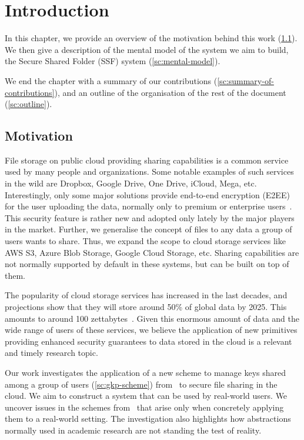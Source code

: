 \chapter{Introduction}
In this chapter, we provide an overview of the motivation
behind this work (\cref{intro-motivation}). 
We then give a
description of the mental model of the system we aim to build,
the Secure Shared Folder (SSF) system (\cref{sc:mental-model}).

We end the chapter with a summary of our contributions (\cref{sc:summary-of-contributions}),
and an outline of the organisation of the rest of the document (\cref{sc:outline}).

\section{Motivation}\label{intro-motivation}

File storage on public cloud providing sharing capabilities is a common service used by many people and organizations.
Some notable examples of such services in the wild are Dropbox, Google Drive, One Drive, iCloud, Mega, etc.
Interestingly, only some major solutions provide end-to-end encryption (E2EE) for the user uploading 
the data, normally only to premium or enterprise users~\cite{Dropbox,googleWorkspaceE2EE,Apple,Mega}.
This security feature is rather new and adopted only lately by the major players in the market.
Further, we generalise the concept of files to any data a group of users wants to share.
Thus, we expand the scope to cloud storage services like AWS S3, Azure Blob Storage, Google Cloud Storage, etc.
Sharing capabilities are not normally supported by default in these systems, but can be built on top of them.

The popularity of cloud storage services has increased in the last decades,
and projections show that they will store around 50\% of global data by 2025.
This amounts to around 100 zettabytes~\cite{SteveMorgan}.
Given this enormous amount of data and the wide range of users of these services, 
we believe the application of new primitives providing enhanced security guarantees
to data stored in the cloud is a relevant and timely research topic.

Our work investigates the application of a new scheme to
manage keys shared among a group of users (\cref{sc:gkp-scheme}) from~\cite{GKP} 
to secure file sharing in the cloud. We aim to construct
a system that can be used by real-world users.
We uncover issues in the schemes from~\cite{GKP}
that arise only when concretely applying them
to a real-world setting. The investigation also
highlights how abstractions normally used in academic
research are not standing the test of reality.

